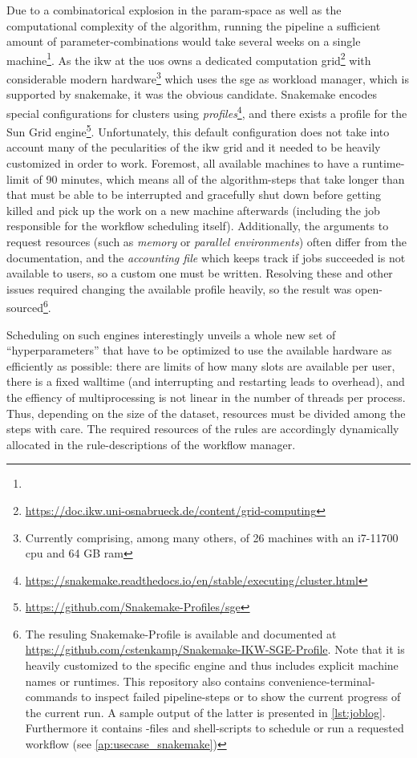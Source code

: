 Due to a combinatorical explosion in the \gls{param}-space as well as the computational complexity of the algorithm, running the pipeline a sufficient amount of parameter-combinations would take several weeks on a single machine\footnote{}. As the \gls{ikw} at the \gls{uos} owns a dedicated computation grid\footnote{\url{https://doc.ikw.uni-osnabrueck.de/content/grid-computing}} with considerable modern hardware\footnote{Currently comprising, among many others, of 26 machines with an i7-11700 \gls{cpu} and 64 GB \gls{ram}} which uses the \gls{sge} as workload manager, which is supported by snakemake, it was the obvious candidate. Snakemake encodes special configurations for clusters using \emph{profiles}\footnote{\url{https://snakemake.readthedocs.io/en/stable/executing/cluster.html}}, and there exists a profile for the Sun Grid engine\footnote{\url{https://github.com/Snakemake-Profiles/sge}}. Unfortunately, this default configuration does not take into account many of the pecularities of the \gls{ikw} grid and it needed to be heavily customized in order to work. Foremost, all available machines to \me have a runtime-limit of 90 minutes, which means all of the algorithm-steps that take longer than that must be able to be interrupted and gracefully shut down before getting killed and pick up the work on a new machine afterwards (including the job responsible for the workflow scheduling itself). Additionally, the arguments to request resources (such as \emph{memory} or \emph{parallel environments}) often differ from the documentation, and the \emph{accounting file} which keeps track if jobs succeeded is not available to users, so a custom one must be written. Resolving these and other issues required changing the available profile heavily, so the result was open-sourced\footnote{The resuling Snakemake-Profile is available and documented at \url{https://github.com/cstenkamp/Snakemake-IKW-SGE-Profile}. Note that it is heavily customized to the specific engine and thus includes explicit machine names or runtimes. This repository also contains convenience-terminal-commands to inspect failed pipeline-steps or to show the current progress of the current run. A sample output of the latter is presented in \autoref{lst:joblog}. Furthermore it contains -files and shell-scripts to schedule or run a requested workflow (see \autoref{ap:usecase_snakemake})}. 


Scheduling on such engines interestingly unveils a whole new set of ``hyperparameters'' that have to be optimized to use the available hardware as efficiently as possible: there are limits of how many slots are available per user, there is a fixed walltime (and interrupting and restarting leads to overhead), and the effiency of multiprocessing is not linear in the number of threads per process. Thus, depending on the size of the dataset, resources must be divided among the steps with care. The required resources of the rules are accordingly dynamically allocated in the rule-descriptions of the workflow manager.

